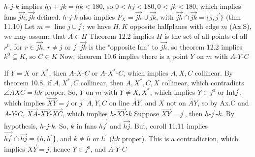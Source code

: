 \documentclass{report}
\begin{document}
\begin{itemize}
            $ h\text{-}j\text{-}k $ implies $hj + jk = hk < 180$, so $0 < hj < 180, 0 < jk < 180 $, which implies fans $\overrightarrow{jh}, \overrightarrow{jk}$ defined. $ h\text{-}j\text{-}k$ also implies $P_{X} = \overrightarrow{jh} \cup \overrightarrow{jk}$, with $\overrightarrow{jh} \cap \overrightarrow{jk} = \{j,j^{\prime}\} $ (thm 11.10)
            \bigbreak \noindent 
            Let $m =$ line $j \cup j^{\prime}$; we have $H,K$ opposite halfplanes with edge $m$ (Ax.S), we may assume that $A \in H$
            \bigbreak \noindent 
            Theorem 12.2 implies $H$ is the set of all points of all $r^{0}$, for $r \in \overrightarrow{jh}$, $r \ne j$ or $j^{\prime} $
            \bigbreak \noindent 
            $\overrightarrow{jk}$ is the "opposite fan" to $\overrightarrow{jh}$, so theorem 12.2 implies $k^{0} \subseteq K$, so $C \in K$
            \bigbreak \noindent 
            Now, theorem 10.6 implies there is a point $Y$ on $m$ with $ A\text{-}Y\text{-}C$
            \bigbreak \noindent 
            \begin{figure}[ht]
                \centering
                \label{fig:ict23}
            \end{figure}
            \bigbreak \noindent 
            If $Y = X$ or $X^{*}$, then $ A\text{-}X\text{-}C$ or $ A\text{-}X^{*}\text{-}C$, which implies $A,X,C$ collinear. By theorem 10.8, if $ A,X^{*}, C$ collinear, then $A,X^{*}, C,X$ collinear, which contradicts $\underline{\angle AXC} = \underline{hk}$ proper.
            \bigbreak \noindent 
            So, $Y$ on $m$ with $Y \ne X, X^{*}$, which implies $Y \in j^{0}$ or $\text{Int}j^{\prime}$, which implies $\overrightarrow{XY} = j$ or $j^{\prime} $
            \bigbreak \noindent 
            $A,Y,C$ on line $\overleftrightarrow{AY}$, and $X$ not on $\overleftrightarrow{AY}$, so by Ax.C and $ A\text{-}Y\text{-}C$, $ \overrightarrow{XA}\text{-}\overrightarrow{XY}\text{-}\overrightarrow{XC} $, which implies $ h\text{-}\overrightarrow{XY}\text{-}k$
            \bigbreak \noindent 
            Suppose $ \overrightarrow{XY} = j^{\prime}$, then $ h\text{-}j^{\prime}\text{-}k$. By hypothesis, $ h\text{-}j\text{-}k$. So, $k$ in fans $\overrightarrow{hj^{\prime}} $ and $ \overrightarrow{hj} $. But, coroll 11.11 implies $ \overrightarrow{hj^{\prime}} \cap \overrightarrow{hj} = \{h, h^{\prime}\}$, and $ k \ne h$ or $h^{\prime}$ ($\underline{hk} $ proper). This is a contradiction, which implies $ \overrightarrow{XY} = j$, hence $Y \in j^{0}$, and $ A\text{-}Y\text{-}C$ \endpf




\end{itemize}
\end{document}
